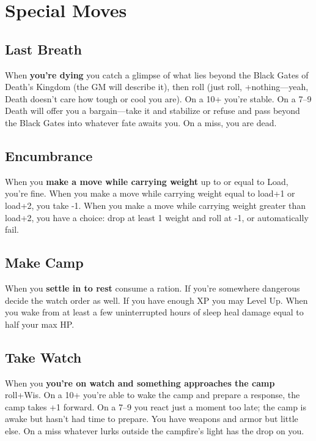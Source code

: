 \chapter{Special Moves}
   
            
\section{Last Breath}   
       

When {\bf you're dying}  you catch a glimpse of what lies beyond the Black Gates of Death's Kingdom (the GM will describe it), then roll (just roll, +nothing—yeah, Death doesn't care how tough or cool you are). On a 10+ you're stable. On a 7–9 Death will offer you a bargain—take it and stabilize or refuse and pass beyond the Black Gates into whatever fate awaits you. On a miss, you are dead.

       
\section{Encumbrance}   
       

When you {\bf make a move while carrying weight}  up to or equal to Load, you're fine. When you make a move while carrying weight equal to load+1 or load+2, you take -1. When you make a move while carrying weight greater than load+2, you have a choice: drop at least 1 weight and roll at -1, or automatically fail.

       
\section{Make Camp}   
       

When you {\bf settle in to rest}  consume a ration. If you're somewhere dangerous decide the watch order as well. If you have enough XP you may Level Up. When you wake from at least a few uninterrupted hours of sleep heal damage equal to half your max HP.

       
\section{Take Watch}   
       

When you {\bf you're on watch and something approaches the camp}  roll+Wis. On a 10+ you're able to wake the camp and prepare a response, the camp takes +1 forward. On a 7–9 you react just a moment too late; the camp is awake but hasn't had time to prepare. You have weapons and armor but little else. On a miss whatever lurks outside the campfire's light has the drop on you.

